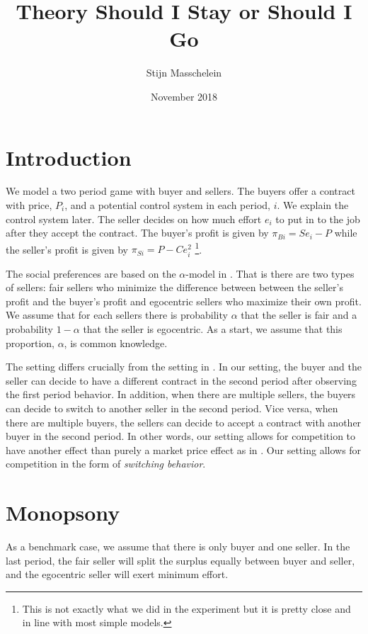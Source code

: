 \documentclass{article}
\title{Theory Should I Stay or Should I Go}
\author{Stijn Masschelein}
\date{November 2018}
\begin{document}
\maketitle

\section{Introduction}

We model a two period game with buyer and sellers. The buyers offer a contract with price, $P_i$, and a potential control system in each period, $i$. We explain the control system later. The seller decides on how much effort $e_i$ to put in to the job after they accept the contract. The buyer's profit is given by $\pi_{Bi} = Se_i - P$ while the seller's profit is given by $\pi_{Si} = P - C e_i^2$ \footnote{This is not exactly what we did in the experiment but it is pretty close and in line with most simple models.}.

The social preferences are based on the $\alpha$-model in \citep{Bolton2008a}. That is there are two types of sellers: fair sellers who minimize the difference between between the seller's profit and the buyer's profit and egocentric sellers who maximize their own profit. We assume that for each sellers there is probability $\alpha$ that the seller is fair and a probability $1-\alpha$ that the seller is egocentric. As a start, we assume that this proportion, $\alpha$, is common knowledge.

The setting differs crucially from the setting in \citep{Choi2014}. In our setting, the buyer and the seller can decide to have a different contract in the second period after observing the first period behavior. In addition, when there are multiple sellers, the buyers can decide to switch to another seller in the second period. Vice versa, when there are multiple buyers, the sellers can decide to accept a contract with another buyer in the second period. In other words, our setting allows for competition to have another effect than purely a market price effect as in  \citep{Choi2014}. Our setting allows for competition in the form of \emph{switching behavior}.

\section{Monopsony}

As a benchmark case, we assume that there is only buyer and one seller. In the last period, the fair seller will split the surplus equally between buyer and seller, and the egocentric seller will exert minimum effort.
\end{document}
